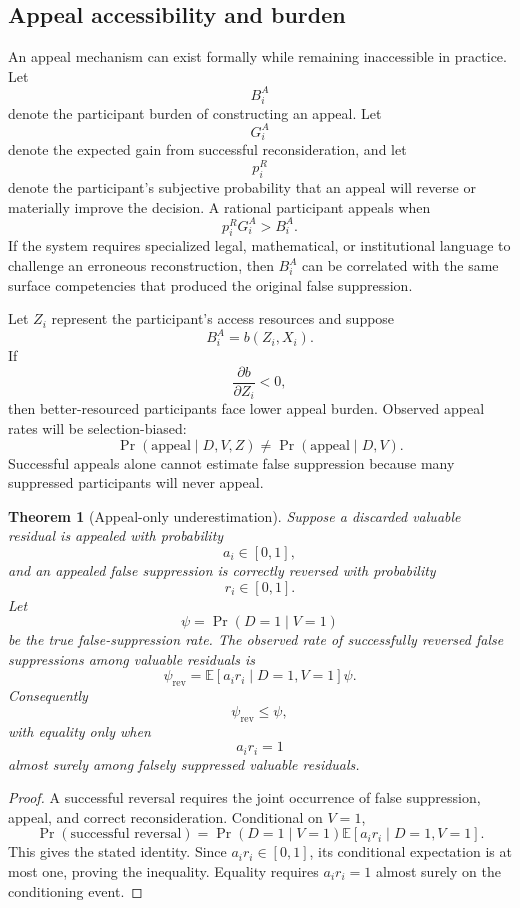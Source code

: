 \documentclass[11pt]{article}
\newtheorem{theorem}[definition]{Theorem}
\theoremstyle{definition}
\DeclareMathOperator{\Prob}{Pr}
\newcommand{\E}{\mathbb{E}}
\begin{document}
\subsection{Appeal accessibility and burden}

An appeal mechanism can exist formally while remaining inaccessible in practice. Let
\[
B_i^{A}
\]
denote the participant burden of constructing an appeal. Let
\[
G_i^{A}
\]
denote the expected gain from successful reconsideration, and let
\[
p_i^{R}
\]
denote the participant's subjective probability that an appeal will reverse or materially improve the decision. A rational participant appeals when
\[
p_i^{R}G_i^{A}
>
B_i^{A}.
\]
If the system requires specialized legal, mathematical, or institutional language to challenge an erroneous reconstruction, then \(B_i^{A}\) can be correlated with the same surface competencies that produced the original false suppression.

Let \(Z_i\) represent the participant's access resources and suppose
\[
B_i^{A}=b(Z_i,X_i).
\]
If
\[
\frac{\partial b}{\partial Z_i}<0,
\]
then better-resourced participants face lower appeal burden. Observed appeal rates will be selection-biased:
\[
\Prob(\text{appeal}\mid D,V,Z)
\neq
\Prob(\text{appeal}\mid D,V).
\]
Successful appeals alone cannot estimate false suppression because many suppressed participants will never appeal.

\begin{theorem}[Appeal-only underestimation]
Suppose a discarded valuable residual is appealed with probability
\[
a_i\in[0,1],
\]
and an appealed false suppression is correctly reversed with probability
\[
r_i\in[0,1].
\]
Let
\[
\psi=\Prob(D=1\mid V=1)
\]
be the true false-suppression rate. The observed rate of successfully reversed false suppressions among valuable residuals is
\[
\psi_{\mathrm{rev}}
=
\E[a_ir_i\mid D=1,V=1]\psi.
\]
Consequently
\[
\psi_{\mathrm{rev}}\leq\psi,
\]
with equality only when
\[
a_ir_i=1
\]
almost surely among falsely suppressed valuable residuals.
\end{theorem}

\begin{proof}
A successful reversal requires the joint occurrence of false suppression, appeal, and correct reconsideration. Conditional on \(V=1\),
\[
\Prob(\text{successful reversal})
=
\Prob(D=1\mid V=1)
\E[a_ir_i\mid D=1,V=1].
\]
This gives the stated identity. Since \(a_ir_i\in[0,1]\), its conditional expectation is at most one, proving the inequality. Equality requires \(a_ir_i=1\) almost surely on the conditioning event.
\end{proof}
\end{document}
